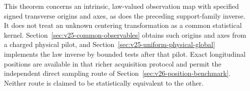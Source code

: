 This theorem concerns an intrinsic, law-valued observation map with specified
signed transverse origins and axes, as does the preceding support-family
inverse.  It does not treat an unknown centering transformation as a common
statistical kernel.  Section~\ref{sec:v25-common-observables} obtains such
origins and axes from a charged physical pilot, and
Section~\ref{sec:v25-uniform-physical-global} implements the law inverse by
bounded tests after that pilot.  Exact longitudinal positions are available
in that richer acquisition protocol and permit the independent direct
sampling route of Section~\ref{sec:v26-position-benchmark}.  Neither route
is claimed to be statistically equivalent to the other.
